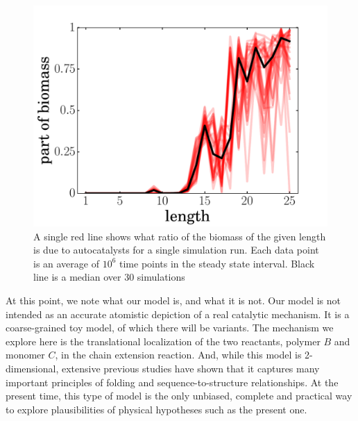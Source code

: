 \documentclass[journal=jacsat,manuscript=article,layout=twocolumn]{achemso}
\begin{document}
\begin{figure}[h!]
  \centering
  \includegraphics[width=\columnwidth]{pictures/biomass.pdf} 
  \caption{\footnotesize{A single red line shows what ratio of the biomass of the 
given length is due to autocatalysts for a single simulation run. Each data point is an average of 
$10^6$ time points in the steady state interval. Black line is a median over 30 simulations }}
  \label{fig:biomass}
\end{figure}






 At this point, we note what our model is, and what it is not.  Our model is not intended as an 
 accurate atomistic depiction of a real catalytic mechanism.  It is a coarse-grained toy model, of 
which there will be variants.  The mechanism we explore here is the translational localization of 
the two reactants, polymer $B$ and monomer $C$, in the chain extension reaction.  And, while this 
model is 2-dimensional, extensive previous studies have shown that it captures many important 
principles of folding and sequence-to-structure relationships.  At the present time, this type of 
model is the only unbiased, complete and practical way to explore plausibilities of physical 
hypotheses such as the present one.
\end{document}
